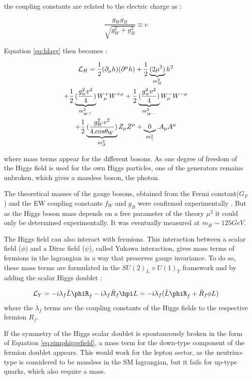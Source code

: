 the coupling constants are related to the electric charge as :

\begin{equation}
    \frac{g_W g_B}{\sqrt{g_{W}^2 + g^{2}_B}} \equiv e
\end{equation}

Equation \ref{eq:hlagr} then becomes :

\begin{multline}
    \mathcal{L}_H = \frac{1}{2}(\partial_{\mu}h)(\partial^{\mu}h) + \frac{1}{2}\underbrace{(2\mu^2 )}_{m_{H}^2}h^2 \\ + \frac{1}{2} \underbrace{(\frac{g_{w}^2 v^2}{4})}_{m_{W^+}^2} W_{\mu}^+ W^{+\mu} + \frac{1}{2} \underbrace{(\frac{g_{w}^2 v^2}{4})}_{m_{W^-}^2} W_{\mu}^- W^{-\mu} \\ + \frac{1}{2} \underbrace{(\frac{g_W^2 v^2}{4.cos\theta_W})}_{m_Z^2} Z_{\mu} Z^{\mu} + \underbrace{0}_{m_{\gamma}^2}.A_{\mu}A^{\mu}
\end{multline} 

where mass terms appear for the different bosons. As one degree of freedom of the Higgs field is used for the own Higgs particles, one of the generators remains unbroken, which gives a massless boson, the photon.

The theoretical masses of the gauge bosons, obtained from the Fermi constant($G_F$) and the EW coupling constants $f_W$ and $g_B$ were confirmed experimentally \cite{ARNISON1983103,BANNER1983476,1983398,BAGNAIA1983130,Group:2008ds}. But as the Higgs boson mass depends on a free parameter of the theory $\mu^2$ it could only be determined experimentally. It was eventually measured at $m_H \sim 125 GeV$.\newline

The Higgs field can also interact with fermions. This interaction between a scalar field ($\phi$) and a Dirac field ($\psi$), called Yukawa interaction, gives mass terms of fermions in the lagrangian in a way that preserves gauge invariance. To do so, these mass terms are formulated in the $SU(2)_L \times U(1)_Y$ framework and by adding the scalar Higgs doublet :

\begin{equation}
    \Lagr_{Y} = -i\lambda_f \Bar{L}\phiR_f - i\lambda_f\Bar{R}_f \hpi L = -i\lambda_f (\Bar{L}\phiR_f + \Bar{R}_f \phi L)
\end{equation}
where the $\lambda_f$ terms are the coupling constants of the Higgs fields to the respective fermion $R_f$.

If the symmetry of the Higgs scalar doublet is spontaneously broken in the form of Equation \ref{eq:simphiggsfield}, a mass term for the down-type component of the fermion doublet appears. This would work for the lepton sector, as the neutrino-type is considered to be massless in the SM lagrangian, but it fails for up-type quarks, which also require a mass.

